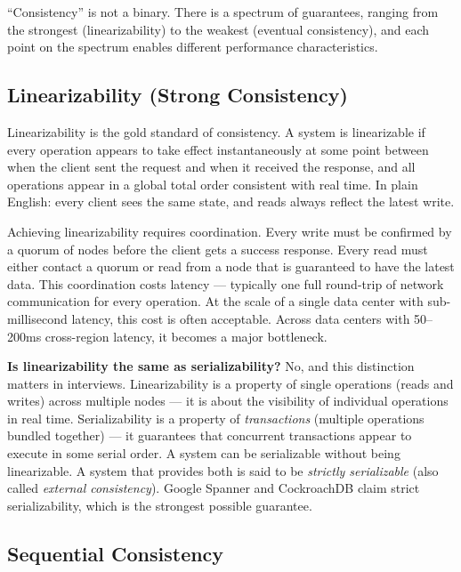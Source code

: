 \documentclass[11pt,a4paper]{article}
\begin{document}
``Consistency'' is not a binary. There is a spectrum of guarantees, ranging from the strongest (linearizability) to the weakest (eventual consistency), and each point on the spectrum enables different performance characteristics.

\subsection{Linearizability (Strong Consistency)}

Linearizability is the gold standard of consistency. A system is linearizable if every operation appears to take effect instantaneously at some point between when the client sent the request and when it received the response, and all operations appear in a global total order consistent with real time. In plain English: every client sees the same state, and reads always reflect the latest write.

Achieving linearizability requires coordination. Every write must be confirmed by a quorum of nodes before the client gets a success response. Every read must either contact a quorum or read from a node that is guaranteed to have the latest data. This coordination costs latency --- typically one full round-trip of network communication for every operation. At the scale of a single data center with sub-millisecond latency, this cost is often acceptable. Across data centers with 50--200ms cross-region latency, it becomes a major bottleneck.

\begin{thinkbox}
\textbf{Is linearizability the same as serializability?} No, and this distinction matters in interviews. Linearizability is a property of single operations (reads and writes) across multiple nodes --- it is about the visibility of individual operations in real time. Serializability is a property of \textit{transactions} (multiple operations bundled together) --- it guarantees that concurrent transactions appear to execute in some serial order. A system can be serializable without being linearizable. A system that provides both is said to be \textit{strictly serializable} (also called \textit{external consistency}). Google Spanner and CockroachDB claim strict serializability, which is the strongest possible guarantee.
\end{thinkbox}

\subsection{Sequential Consistency}
\end{document}
